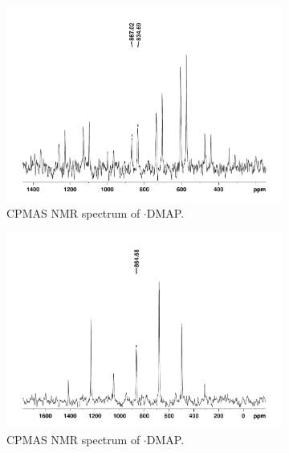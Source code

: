 \begin{refsection}
\begin{figure}
  \centering
  \begin{subfigure}{\linewidth}
    \centering
    \includegraphics[height=0.28\textheight]{Figures/ebs-4ome-dmap-cpmas-77se.pdf}
    \caption{ CPMAS NMR spectrum of $\cdot$DMAP.}
  \end{subfigure}
  \begin{subfigure}{\linewidth}
    \centering
    \includegraphics[height=0.28\textheight]{Figures/ebs-ph-dmap-cpmas-77se.pdf}
    \caption{ CPMAS NMR spectrum of $\cdot$DMAP.}
  \end{subfigure}
  \begin{subfigure}{\linewidth}
    \centering

\end{subfigure}
\end{figure}
\end{refsection}
